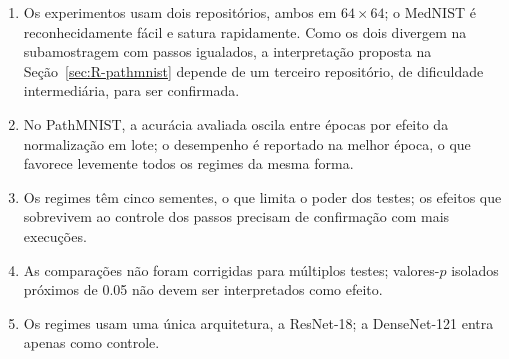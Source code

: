 \begin{enumerate}
    \item Os experimentos usam dois repositórios, ambos em $64 \times 64$; o
          MedNIST é reconhecidamente fácil e satura rapidamente. Como os dois
          divergem na subamostragem com passos igualados, a interpretação
          proposta na Seção~\ref{sec:R-pathmnist} depende de um terceiro
          repositório, de dificuldade intermediária, para ser confirmada.
    \item No PathMNIST, a acurácia avaliada oscila entre épocas por efeito da
          normalização em lote; o desempenho é reportado na melhor época, o
          que favorece levemente todos os regimes da mesma forma.
    \item Os regimes têm cinco sementes, o que limita o poder dos testes; os
          efeitos que sobrevivem ao controle dos passos precisam de
          confirmação com mais execuções.
    \item As comparações não foram corrigidas para múltiplos testes; valores-$p$
          isolados próximos de \num{0,05} não devem ser interpretados como
          efeito.
    \item Os regimes usam uma única arquitetura, a ResNet-18; a DenseNet-121
          entra apenas como controle.
\end{enumerate}

